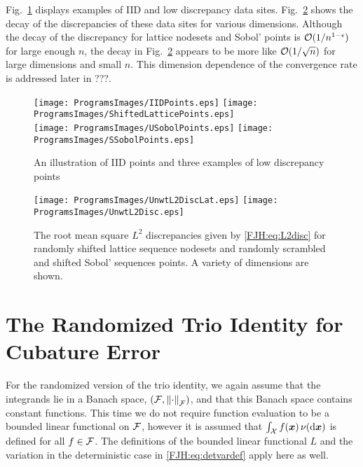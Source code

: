 \documentclass[graybox,footinfo]{svmult}
\begin{document}
Fig.\ \ref{FJH:fig:plotsdiffpts} displays examples of IID and low discrepancy data sites.  
Fig.\ \ref{FJH:fig:unwtdiscdiffpts} shows the decay of the discrepancies of these data 
sites for various dimensions.  Although the decay of the discrepancy for lattice nodesets 
and Sobol' points is $\mathcal{O}(1/n^{1-\epsilon})$ for large enough $n$, the decay in Fig.\ 
\ref{FJH:fig:unwtdiscdiffpts} appears to be 
more like $\mathcal{O}(1/\sqrt{n})$ for large dimensions and small $n$.   This dimension 
dependence of the convergence rate is addressed later in ???.  


\begin{FJHLesson}
	\FJHLessonTwo
\end{FJHLesson}


\begin{figure}
	\centering
	\texttt{[image: ProgramsImages/IIDPoints.eps]} \qquad
	\texttt{[image: ProgramsImages/ShiftedLatticePoints.eps]} \\
	\texttt{[image: ProgramsImages/USobolPoints.eps]} \qquad
	\texttt{[image: ProgramsImages/SSobolPoints.eps]}
	\caption{An illustration of IID points and three examples of low discrepancy points 
	\label{FJH:fig:plotsdiffpts}}
\end{figure}

\begin{figure}
	\centering
	  \texttt{[image: ProgramsImages/UnwtL2DiscLat.eps]}   
	  \qquad 
	  \texttt{[image: ProgramsImages/UnwtL2Disc.eps]} 
	\caption{The root mean square $L^2$ discrepancies given by \eqref{FJH:eq:L2disc} 
	for randomly shifted 
	lattice sequence nodesets and randomly scrambled and shifted Sobol' sequences 
	points.  A variety of dimensions are shown.
		\label{FJH:fig:unwtdiscdiffpts}}
\end{figure}

\section{The Randomized Trio Identity for Cubature Error} \label{FJH:sec:rndtrio}
For the randomized version of the trio identity, we again assume that the integrands lie in 
a Banach space, $(\mathcal{F},\left \lVert \cdot \right \rVert_{\mathcal{F}})$, and that this Banach space contains 
constant functions.  This time we do not require 
function evaluation to be a bounded linear functional on $\mathcal{F}$, however it is assumed 
that $\int_{\mathcal{X}} f({\boldsymbol{x}}) \, \nu(\mathrm{d}{\boldsymbol{x}})$ is defined  for all $f \in \mathcal{F}$.  The definitions of the 
bounded linear functional $L$ and the variation in the deterministic case in  
\eqref{FJH:eq:detvardef} apply here as well.
\end{document}
